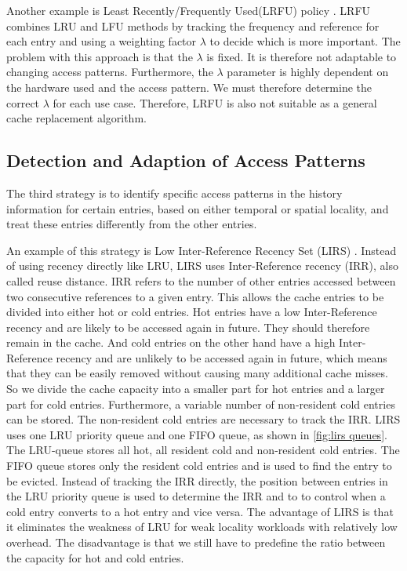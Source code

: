 \documentclass[
	12pt,
	a4paper,
	abstract,
	bibliography=totoc,
	chapterprefix,
	headings=openright,
	numbers=endperiod,
	parskip=half,
	twoside,
]{scrreprt}
\begin{document}
Another example is Least Recently/Frequently Used(LRFU) policy \cite{lee2001lrfu}.
LRFU combines LRU and LFU methods by tracking the frequency and reference for each entry and using a weighting factor $\lambda$ to decide which is more important.
The problem with this approach is that the $\lambda$ is fixed.
It is therefore not adaptable to changing access patterns.
Furthermore, the $\lambda$ parameter is highly dependent on the hardware used and the access pattern.
We must therefore determine the correct $\lambda$ for each use case.
Therefore, LRFU is also not suitable as a general cache replacement algorithm.

\subsection{Detection and Adaption of Access Patterns}

The third strategy is to identify specific access patterns in the history information for certain entries, based on either temporal or spatial locality, and treat these entries differently from the other entries.

An example of this strategy is Low Inter-Reference Recency Set (LIRS) \cite{10.1145/511399.511340}.
Instead of using recency directly like LRU, LIRS uses Inter-Reference recency (IRR), also called reuse distance.
IRR refers to the number of other entries accessed between two consecutive references to a given entry.
This allows the cache entries to be divided into either hot or cold entries.
Hot entries have a low Inter-Reference recency and are likely to be accessed again in future.
They should therefore remain in the cache.
And cold entries on the other hand have a high Inter-Reference recency and are unlikely to be accessed again in future, which means that they can be easily removed without causing many additional cache misses.
So we divide the cache capacity into a smaller part for hot entries and a larger part for cold entries.
Furthermore, a variable number of non-resident cold entries can be stored.
The non-resident cold entries are necessary to track the IRR.
LIRS uses one LRU priority queue and one FIFO queue, as shown in \cref{fig:lirs queues}.
The LRU-queue stores all hot, all resident cold and non-resident cold entries.
The FIFO queue stores only the resident cold entries and is used to find the entry to be evicted.
Instead of tracking the IRR directly, the position between entries in the LRU priority queue is used to determine the IRR and to 
to control when a cold entry converts to a hot entry and vice versa.
The advantage of LIRS is that it eliminates the weakness of LRU for weak locality workloads with relatively low overhead.
The disadvantage is that we still have to predefine the ratio between the capacity for hot and cold entries.
\end{document}
